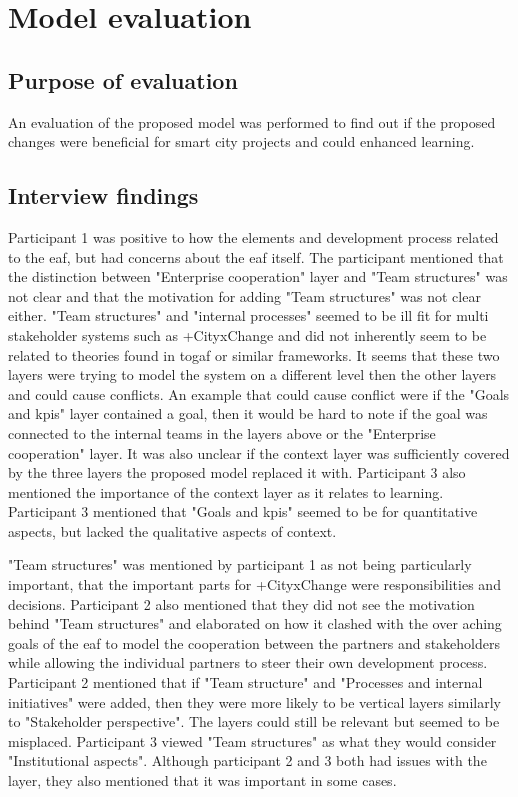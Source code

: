 \chapter{Model evaluation}
\label{chap:evaluation}
\section{Purpose of evaluation}
An evaluation of the proposed model was performed to find out if the proposed changes were beneficial for smart city projects and could enhanced learning. 

\section{Interview findings}
Participant 1 was positive to how the elements and development process related to the \gls{eaf}, but had concerns about the \gls{eaf} itself. The participant mentioned that the distinction between "Enterprise cooperation" layer and "Team structures" was not clear and that the motivation for adding "Team structures" was not clear either. "Team structures" and "internal processes" seemed to be ill fit for multi stakeholder systems such as +CityxChange and did not inherently seem to be related to theories found in \gls{togaf} or similar frameworks. It seems that these two layers were trying to model the system on a different level then the other layers and could cause conflicts. An example that could cause conflict were if the "Goals and \glspl{kpi}" layer contained a goal, then it would be hard to note if the goal was connected to the internal teams in the layers above or the "Enterprise cooperation" layer. It was also unclear if the context layer was sufficiently covered by the three layers the proposed model replaced it with. Participant 3 also mentioned the importance of the context layer as it relates to learning. Participant 3 mentioned that "Goals and \glspl{kpi}" seemed to be for quantitative aspects, but lacked the qualitative aspects of context.

"Team structures" was mentioned by participant 1 as not being particularly important, that the important parts for +CityxChange were responsibilities and decisions. Participant 2 also mentioned that they did not see the motivation behind "Team structures" and elaborated on how it clashed with the over aching goals of the \gls{eaf} to model the cooperation between the partners and stakeholders while allowing the individual partners to steer their own development process. Participant 2 mentioned that if "Team structure" and "Processes and internal initiatives" were added, then they were more likely to be vertical layers similarly to "Stakeholder perspective". The layers could still be relevant but seemed to be misplaced. Participant 3 viewed "Team structures" as what they would consider "Institutional aspects". Although participant 2 and 3 both had issues with the layer, they also mentioned that it was important in some cases.

